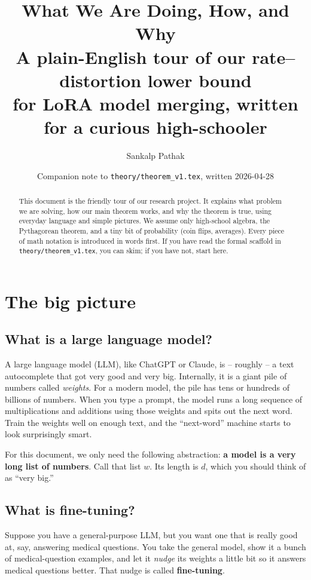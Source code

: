 \documentclass[11pt]{article}
\title{What We Are Doing, How, and Why \\
       \large A plain-English tour of our rate--distortion lower bound \\
       for LoRA model merging, written for a curious high-schooler}
\author{Sankalp Pathak}
\date{Companion note to \texttt{theory/theorem\_v1.tex}, written 2026-04-28}
\begin{document}
\maketitle

\begin{abstract}
This document is the friendly tour of our research project. It explains
what problem we are solving, how our main theorem works, and why the
theorem is true, using everyday language and simple pictures. We assume
only high-school algebra, the Pythagorean theorem, and a tiny bit of
probability (coin flips, averages). Every piece of math notation is
introduced in words first. If you have read the formal scaffold in
\texttt{theory/theorem\_v1.tex}, you can skim; if you have not, start
here.
\end{abstract}

\tableofcontents

\section{The big picture}

\subsection{What is a large language model?}

A large language model (LLM), like ChatGPT or Claude, is -- roughly --
a text autocomplete that got very good and very big. Internally, it is
a giant pile of numbers called \emph{weights}. For a modern model, the
pile has tens or hundreds of billions of numbers. When you type a
prompt, the model runs a long sequence of multiplications and additions
using those weights and spits out the next word. Train the weights well
on enough text, and the ``next-word'' machine starts to look
surprisingly smart.

For this document, we only need the following abstraction: \textbf{a
model is a very long list of numbers}. Call that list $w$. Its length
is $d$, which you should think of as ``very big.''

\subsection{What is fine-tuning?}

Suppose you have a general-purpose LLM, but you want one that is really
good at, say, answering medical questions. You take the general model,
show it a bunch of medical-question examples, and let it \emph{nudge}
its weights a little bit so it answers medical questions better. That
nudge is called \textbf{fine-tuning}.
\end{document}
